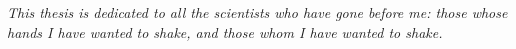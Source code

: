 \chapter*{~}


\begin{center}                  %
\vspace*{3in}                   %
    \begin{onehalfspacing}      %
    \textit{
    This thesis is dedicated to all the scientists who have gone before me: those whose hands I have wanted to shake, and those whom I have wanted to shake.     %
    }
\end{onehalfspacing}
\end{center}